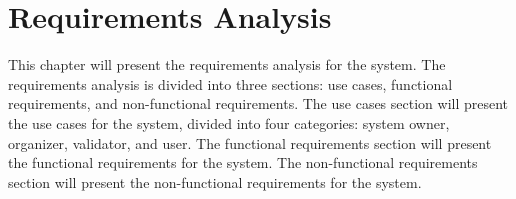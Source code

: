 \chapter{Requirements Analysis}
\label{ch:requirements_analysis}

This chapter will present the requirements analysis for the system. The requirements analysis is divided into three sections: use cases, functional requirements, and non-functional requirements. The use cases section will present the use cases for the system, divided into four categories: system owner, organizer, validator, and user. The functional requirements section will present the functional requirements for the system. The non-functional requirements section will present the non-functional requirements for the system.




